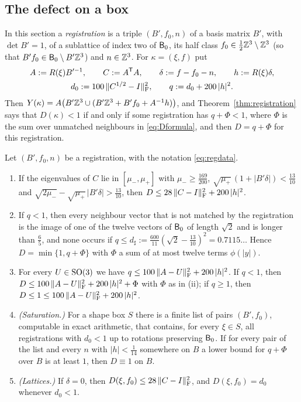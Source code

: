 \subsection{The defect on a box}\label{ssec:Dbox}

In this section a \emph{registration} is a triple $(B',f_0,n)$ of a basis matrix $B'$, with $\det B'=1$, of a sublattice of index two
of $\mathsf B_0$, its half class $f_0\in\frac12\mathbb Z^3\setminus\mathbb Z^3$ (so that $B'f_0\in\mathsf B_0\setminus B'\mathbb Z^3$) and $n\in\mathbb Z^3$. For $\kappa=(\xi,f)$ put
\begin{equation}\label{eq:regdata}
\begin{gathered}
  A:=R(\xi)B'^{-1},\qquad C:=A^\mathsf T A,\qquad \delta:=f-f_0-n,\qquad h:=R(\xi)\delta,\\
  d_0:=100\,\|C^{1/2}-I\|_\mathrm F^2,\qquad q:=d_0+200\,|h|^2 .
\end{gathered}
\end{equation}
Then $Y(\kappa)=A\bigl(B'\mathbb Z^3\cup(B'\mathbb Z^3+B'f_0+A^{-1}h)\bigr)$, and Theorem~\ref{thm:registration} says that $D(\kappa)<1$ if and only if
some registration has $q+\Phi<1$, where $\Phi$ is the sum over unmatched neighbours in \eqref{eq:Dformula}, and then $D=q+\Phi$ for
this registration.

\begin{lemma}\label{lem:Dbox}
Let $(B',f_0,n)$ be a registration, with the notation \eqref{eq:regdata}.
\begin{enumerate}
\item[\textup{(i)}] If the eigenvalues of $C$ lie in $[\mu_-,\mu_+]$ with $\mu_-\ge\frac{169}{200}$,
$\sqrt{\mu_+}\,(1+|B'\delta|)<\frac{13}{10}$ and $\sqrt{2\mu_-}-\sqrt{\mu_+}\,|B'\delta|>\frac{13}{10}$, then
$D\le28\,\|C-I\|_\mathrm F^2+200\,|h|^2$.
\item[\textup{(ii)}] If $q<1$, then every neighbour vector that is not matched by the registration is the image of one of the twelve
vectors of $\mathsf B_0$ of length $\sqrt2$ and is longer than $\frac65$, and none occurs if
$q\le d_\sharp:=\frac{600}{11}(\sqrt2-\frac{13}{10})^2=0.7115\ldots$ Hence $D=\min\{1,q+\Phi\}$ with $\Phi$ a sum of at most twelve terms
$\phi(|y|)$.
\item[\textup{(iii)}] For every $U\in\mathrm{SO}(3)$ we have $q\le100\,\|A-U\|_\mathrm F^2+200\,|h|^2$. If $q<1$, then
$D\le100\,\|A-U\|_\mathrm F^2+200\,|h|^2+\Phi$ with $\Phi$ as in \textup{(ii)}; if $q\ge1$, then $D\le1\le100\,\|A-U\|_\mathrm F^2+200\,|h|^2$.
\item[\textup{(iv)}] \emph{(Saturation.)} For a shape box $S$ there is a finite list of pairs $(B',f_0)$, computable in exact
arithmetic, that contains, for every $\xi\in S$, all registrations with $d_0<1$ up to rotations preserving $\mathsf B_0$. If for every pair of
the list and every $n$ with $|h|<\frac1{14}$ somewhere on $B$ a lower bound for $q+\Phi$ over $B$ is at least $1$, then $D\equiv1$ on $B$.
\item[\textup{(v)}] \emph{(Lattices.)} If $\delta=0$, then $D(\xi,f_0)\le28\,\|C-I\|_\mathrm F^2$, and $D(\xi,f_0)=d_0$ whenever $d_0<1$.
\end{enumerate}
\end{lemma}

